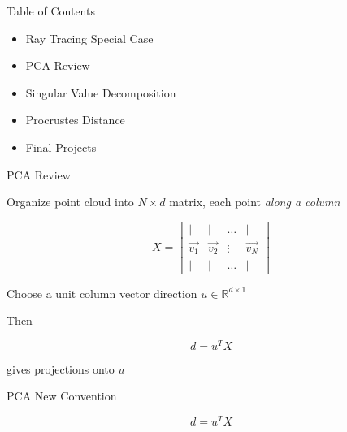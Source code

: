 \documentclass{beamer}
\begin{document}
\begin{frame}{Table of Contents}
\begin{itemize}[label=$\vartriangleright$]
	\item Ray Tracing Special Case
\end{itemize}
\begin{itemize}[label=$\blacktriangleright$]
	\item PCA Review
\end{itemize}
\begin{itemize}[label=$\vartriangleright$]
	\item Singular Value Decomposition
\end{itemize}
\begin{itemize}[label=$\vartriangleright$]
	\item Procrustes Distance
\end{itemize}
\begin{itemize}[label=$\vartriangleright$]
	\item Final Projects
\end{itemize}
\end{frame}

\begin{frame}{PCA Review}

Organize point cloud into $N \times d$ matrix, each point {\em along a column}

\[ X = \left[ \begin{array}{cccc} | & | & \hdots & | \\ \vec{v_1} & \vec{v_2} & \vdots & \vec{v_N} \\ | & | & \hdots & | \end{array} \right] \]

Choose a unit column vector direction $u \in \mathbb{R}^{d \times 1}$

Then 

\[ d = u^TX \]

gives projections onto $u$


\end{frame}

\begin{frame}{PCA New Convention}

\[ d = u^TX \]




\end{frame}
\end{document}
